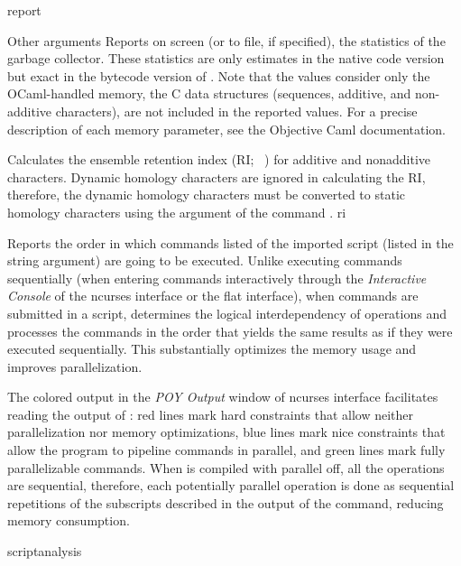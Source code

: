 \begin{command}{report}{}
\begin{arguments}
\begin{argumentgroup}{Other arguments}
                {Reports on screen (or to file, if specified), the statistics of
                the garbage collector.  These statistics are only estimates in
                the native code version but exact in the bytecode version of
                \poy. Note that the values consider only the OCaml-handled
                memory, the C data structures (sequences, additive, and
                non-additive characters), are not included in the reported
                values. For a precise description of each memory parameter, see
                the Objective Caml documentation.}
                {}
	     
	      {Calculates the ensemble retention index (RI; ~\cite{farris1989}) for additive
	      and nonadditive characters. Dynamic homology characters are ignored in calculating
	      the RI, therefore, the dynamic homology characters must be converted
	      to static homology characters using the argument  
	      of the command .}
	      {ri}
	     
                {Reports the order in which commands listed of the imported
                script (listed in the string argument) are going to be executed.
                Unlike executing commands sequentially (when entering commands
                interactively through the \emph{Interactive Console} of the ncurses
                interface or the flat interface), when commands are submitted in a 
                script, \poy determines the logical interdependency of operations
                and processes the commands in the order that yields the same
                results as if they were executed sequentially. This substantially
                optimizes the memory usage and improves parallelization.
                
                The colored output in the \emph{POY Output} window of ncurses
                interface facilitates reading the output of :
                red lines mark hard constraints that allow neither
                parallelization nor memory optimizations, blue lines mark 
                nice constraints that allow the program to pipeline commands in
                parallel, and green lines mark fully parallelizable commands. When \poy
                is compiled with parallel off, all the operations are
                sequential, therefore, each potentially parallel operation is
                done as sequential repetitions of the subscripts described in
                the output of the command, reducing memory consumption.}
                {scriptanalysis}
                

\end{argumentgroup}
\end{arguments}
\end{command}
